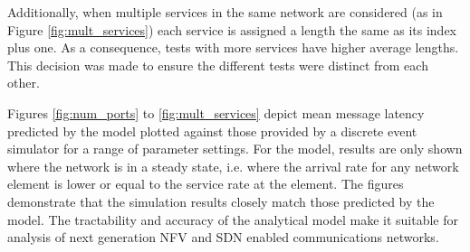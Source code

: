 Additionally, when multiple services in the same network are considered (as in Figure \ref{fig:mult_services}) each service is assigned a length the same as its index plus one. As a consequence, tests with more services have higher average lengths. This decision was made to ensure the different tests were distinct from each other.

Figures \ref{fig:num_ports} to \ref{fig:mult_services} depict mean message latency predicted by the model plotted against those provided by a discrete event simulator for a range of parameter settings. For the model, results are only shown where the network is in a steady state, i.e. where the arrival rate for any network element is lower or equal to the service rate at the element. The figures demonstrate that the simulation results closely match those predicted by the model. The tractability and accuracy of the analytical model make it suitable for analysis of next generation NFV and SDN enabled communications networks.